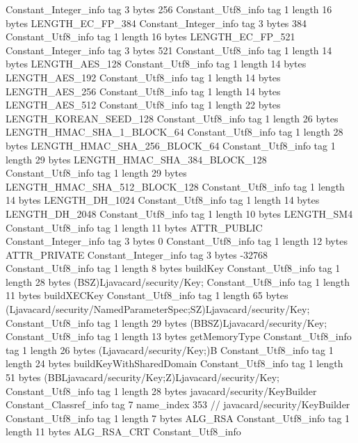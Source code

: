 {{{		}
		Constant_Integer_info {
			tag	3
			bytes	256
		}
		Constant_Utf8_info {
			tag	1
			length	16
			bytes	LENGTH_EC_FP_384
		}
		Constant_Integer_info {
			tag	3
			bytes	384
		}
		Constant_Utf8_info {
			tag	1
			length	16
			bytes	LENGTH_EC_FP_521
		}
		Constant_Integer_info {
			tag	3
			bytes	521
		}
		Constant_Utf8_info {
			tag	1
			length	14
			bytes	LENGTH_AES_128
		}
		Constant_Utf8_info {
			tag	1
			length	14
			bytes	LENGTH_AES_192
		}
		Constant_Utf8_info {
			tag	1
			length	14
			bytes	LENGTH_AES_256
		}
		Constant_Utf8_info {
			tag	1
			length	14
			bytes	LENGTH_AES_512
		}
		Constant_Utf8_info {
			tag	1
			length	22
			bytes	LENGTH_KOREAN_SEED_128
		}
		Constant_Utf8_info {
			tag	1
			length	26
			bytes	LENGTH_HMAC_SHA_1_BLOCK_64
		}
		Constant_Utf8_info {
			tag	1
			length	28
			bytes	LENGTH_HMAC_SHA_256_BLOCK_64
		}
		Constant_Utf8_info {
			tag	1
			length	29
			bytes	LENGTH_HMAC_SHA_384_BLOCK_128
		}
		Constant_Utf8_info {
			tag	1
			length	29
			bytes	LENGTH_HMAC_SHA_512_BLOCK_128
		}
		Constant_Utf8_info {
			tag	1
			length	14
			bytes	LENGTH_DH_1024
		}
		Constant_Utf8_info {
			tag	1
			length	14
			bytes	LENGTH_DH_2048
		}
		Constant_Utf8_info {
			tag	1
			length	10
			bytes	LENGTH_SM4
		}
		Constant_Utf8_info {
			tag	1
			length	11
			bytes	ATTR_PUBLIC
		}
		Constant_Integer_info {
			tag	3
			bytes	0
		}
		Constant_Utf8_info {
			tag	1
			length	12
			bytes	ATTR_PRIVATE
		}
		Constant_Integer_info {
			tag	3
			bytes	-32768
		}
		Constant_Utf8_info {
			tag	1
			length	8
			bytes	buildKey
		}
		Constant_Utf8_info {
			tag	1
			length	28
			bytes	(BSZ)Ljavacard/security/Key;
		}
		Constant_Utf8_info {
			tag	1
			length	11
			bytes	buildXECKey
		}
		Constant_Utf8_info {
			tag	1
			length	65
			bytes	(Ljavacard/security/NamedParameterSpec;SZ)Ljavacard/security/Key;
		}
		Constant_Utf8_info {
			tag	1
			length	29
			bytes	(BBSZ)Ljavacard/security/Key;
		}
		Constant_Utf8_info {
			tag	1
			length	13
			bytes	getMemoryType
		}
		Constant_Utf8_info {
			tag	1
			length	26
			bytes	(Ljavacard/security/Key;)B
		}
		Constant_Utf8_info {
			tag	1
			length	24
			bytes	buildKeyWithSharedDomain
		}
		Constant_Utf8_info {
			tag	1
			length	51
			bytes	(BBLjavacard/security/Key;Z)Ljavacard/security/Key;
		}
		Constant_Utf8_info {
			tag	1
			length	28
			bytes	javacard/security/KeyBuilder
		}
		Constant_Classref_info {
			tag	7
			name_index	353		// javacard/security/KeyBuilder
		}
		Constant_Utf8_info {
			tag	1
			length	7
			bytes	ALG_RSA
		}
		Constant_Utf8_info {
			tag	1
			length	11
			bytes	ALG_RSA_CRT
		}
		Constant_Utf8_info {
}}}
